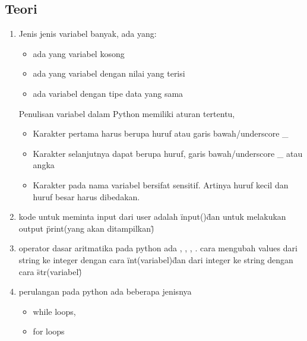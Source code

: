 	\subsection {Teori}
		\begin {enumerate}
			\item Jenis jenis variabel banyak, ada yang:
				\begin {itemize}
					\item ada yang variabel kosong
					\item ada yang variabel dengan nilai yang terisi
					\item ada variabel dengan tipe data yang sama
				\end {itemize}
			Penulisan variabel dalam Python memiliki aturan tertentu,
				\begin {itemize}
					\item Karakter pertama harus berupa huruf atau garis bawah/underscore _
					\item Karakter selanjutnya dapat berupa huruf, garis bawah/underscore _ atau angka
					\item Karakter pada nama variabel bersifat sensitif. Artinya huruf kecil dan huruf besar harus dibedakan.
				\end {itemize}
			\item kode untuk meminta input dari user adalah \"input()\" dan untuk melakukan output \"print(yang akan ditampilkan)\"
			\item operator dasar aritmatika pada python ada \+, \*, \-, \/. cara mengubah values dari string ke integer dengan cara \"int(variabel)\" dan dari integer ke string dengan cara \"str(variabel)\"
			\item perulangan pada python ada beberapa jenisnya
				\begin {itemize}
					\item while loops,
					\item for loops
				\end {itemize}
\end{enumerate}
